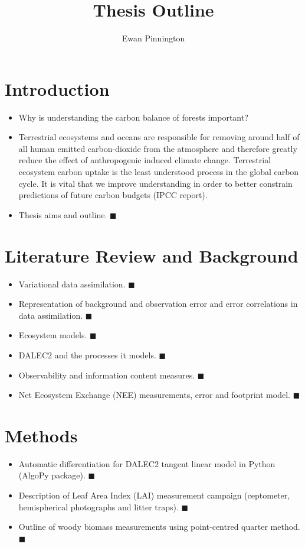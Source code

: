 \documentclass[11pt]{article}
\title{Thesis Outline}
\author{Ewan Pinnington}
\begin{document}
\maketitle
\section{Introduction}
\begin{itemize}
\item Why is understanding the carbon balance of forests important?
\item Terrestrial ecosystems and oceans are responsible for removing around half of all human emitted carbon-dioxide from the atmosphere and therefore greatly reduce the effect of anthropogenic induced climate change. Terrestrial ecosystem carbon uptake is the least understood process in the global carbon cycle. It is vital that we improve understanding in order to better constrain predictions of future carbon budgets (IPCC report).
\item Thesis aims and outline. {\color{yellow} $\blacksquare$}
\end{itemize}


\section{Literature Review and Background}
\begin{itemize}
\item Variational data assimilation. {\color{yellow} $\blacksquare$}
\item Representation of background and observation error and error correlations in data assimilation. {\color{yellow} $\blacksquare$}
\item Ecosystem models. {\color{yellow} $\blacksquare$}
\item DALEC2 and the processes it models. {\color{yellow} $\blacksquare$}
\item Observability and information content measures. {\color{yellow} $\blacksquare$}
\item Net Ecosystem Exchange (NEE) measurements, error and footprint model. {\color{yellow} $\blacksquare$}
\end{itemize}


\section{Methods}
\begin{itemize}
\item Automatic differentiation for DALEC2 tangent linear model in Python (AlgoPy package). {\color{yellow} $\blacksquare$}
\item Description of Leaf Area Index (LAI) measurement campaign (ceptometer, hemispherical photographs and litter traps). {\color{yellow} $\blacksquare$}
\item Outline of woody biomass measurements using point-centred quarter method. {\color{yellow} $\blacksquare$}
\end{itemize}
\end{document}
